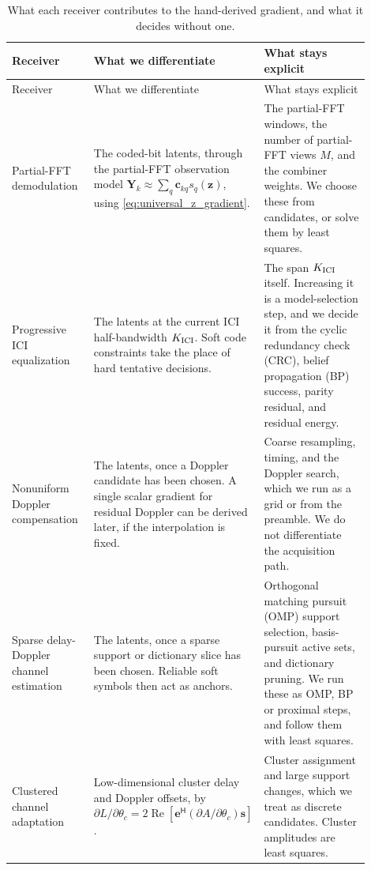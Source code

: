 \documentclass[11pt]{article}
\newcommand{\Hh}{^{\mathsf H}}
\newcommand{\Ree}{\operatorname{Re}}
\begin{document}
\begin{longtable}{@{}>{\raggedright\arraybackslash}p{0.24\linewidth}>{\raggedright\arraybackslash}p{0.28\linewidth}>{\raggedright\arraybackslash}p{0.38\linewidth}@{}}
\caption{What each receiver contributes to the hand-derived gradient, and what
it decides without one.\label{tab:concepts}}\\
\toprule
Receiver & What we differentiate & What stays explicit \\
\midrule
\endfirsthead
\toprule
Receiver & What we differentiate & What stays explicit \\
\midrule
\endhead
Partial-FFT demodulation
& The coded-bit latents, through the partial-FFT observation model
$\bm Y_k\approx\sum_q \bm c_{kq}s_q(\bm z)$, using
\eqref{eq:universal_z_gradient}.
& The partial-FFT windows, the number of partial-FFT views $M$, and the combiner weights.  We
choose these from candidates, or solve them by least squares. \\

Progressive ICI equalization
& The latents at the current ICI half-bandwidth $K_{\rm ICI}$.  Soft code
constraints take the place of hard tentative decisions.
& The span $K_{\rm ICI}$ itself.  Increasing it is a model-selection step, and
we decide it from the cyclic redundancy check (CRC), belief propagation (BP)
success, parity residual, and residual energy. \\

Nonuniform Doppler compensation
& The latents, once a Doppler candidate has been chosen.  A single scalar
gradient for residual Doppler can be derived later, if the interpolation is
fixed.
& Coarse resampling, timing, and the Doppler search, which we run as a grid or
from the preamble.  We do not differentiate the acquisition path. \\

Sparse delay-Doppler channel estimation
& The latents, once a sparse support or dictionary slice has been chosen.
Reliable soft symbols then act as anchors.
& Orthogonal matching pursuit (OMP) support selection, basis-pursuit active
sets, and dictionary pruning.  We run these as OMP, BP or proximal steps, and
follow them with least squares. \\

Clustered channel adaptation
& Low-dimensional cluster delay and Doppler offsets, by
$\partial L/\partial\theta_c=2\Ree[\bm e\Hh(\partial A/\partial\theta_c)\bm s]$.
& Cluster assignment and large support changes, which we treat as discrete
candidates.  Cluster amplitudes are least squares. \\


\end{longtable}
\end{document}
